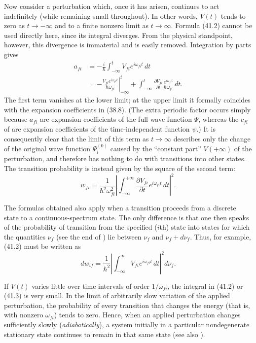 Now consider a perturbation which, once it has arisen, continues to act
indefinitely (while remaining small throughout). In other words, $V(t)$ tends
to zero as $t\to-\infty$ and to a finite nonzero limit as $t\to\infty$.
Formula (41.2) cannot be used directly here, since its integral diverges. From
the physical standpoint, however, this divergence is immaterial and is easily
removed. Integration by parts gives
\[
 \begin{aligned}
  a_{fi}&=-\frac i\hbar\int_{-\infty}^tV_{fi}e^{i\omega_{fi}t}\,dt\\
  &=-\left.\frac{V_{fi}e^{i\omega_{fi}t}}{\hbar\omega_{fi}}
    \right|_{-\infty}^t
  +\int_{-\infty}^t\frac{\partial V_{fi}}{\partial t}
    \frac{e^{i\omega_{fi}t}}{\hbar\omega_{fi}}\,dt.
 \end{aligned}
\]
The first term vanishes at the lower limit; at the upper limit it formally
coincides with the expansion coefficients in (38.8). (The extra periodic
factor occurs simply because $a_{fi}$ are expansion coefficients of the full
wave function $\Psi$, whereas the $c_{fi}$ of  are expansion coefficients
of the time-independent function $\psi$.) It is consequently clear that the
limit of this term as $t\to\infty$ describes only the change of the original
wave function $\Psi_i^{(0)}$ caused by the ``constant part'' $V(+\infty)$ of
the perturbation, and therefore has nothing to do with transitions into other
states. The transition probability is instead given by the square of the
second term:
\begin{equation}
  w_{fi}=\frac1{\hbar^2\omega_{fi}^2}\left|
    \int_{-\infty}^{+\infty}\frac{\partial V_{fi}}{\partial t}
    e^{i\omega_{fi}t}\,dt
  \right|^2.
  \tag{41.3}
\end{equation}

The formulas obtained also apply when a transition proceeds from a discrete
state to a continuous-spectrum state. The only difference is that one then
speaks of the probability of transition from the specified ($i$th) state into
states for which the quantities $\nu_f$ (see the end of ) lie between
$\nu_f$ and $\nu_f+d\nu_f$. Thus, for example, (41.2) must be written as
\begin{equation}
  dw_{if}=\frac1{\hbar^2}\left|
    \int_{-\infty}^{\infty}V_{fi}e^{i\omega_{fi}t}\,dt
  \right|^2d\nu_f.
  \tag{41.4}
\end{equation}

If $V(t)$ varies little over time intervals of order $1/\omega_{fi}$, the
integral in (41.2) or (41.3) is very small. In the limit of arbitrarily slow
variation of the applied perturbation, the probability of every transition
that changes the energy (that is, with nonzero $\omega_{fi}$) tends to zero.
Hence, when an applied perturbation changes sufficiently slowly
(\emph{adiabatically}), a system initially in a particular nondegenerate
stationary state continues to remain in that same state (see also ).

